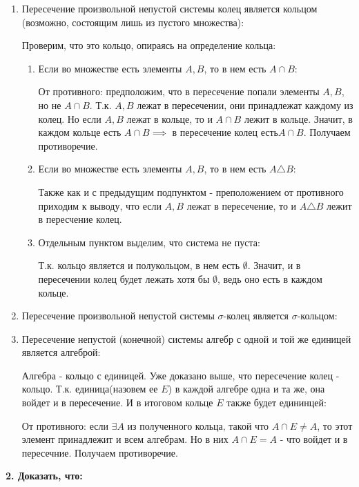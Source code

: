 \documentclass{article}
\begin{document}
\begin{enumerate}
\item Пересечение произвольной непустой системы колец является кольцом (возможно, состоящим лишь из пустого множества):

Проверим, что это кольцо, опираясь на определение кольца:

\begin{enumerate}
\item Если во множестве есть элементы $A, B$, то в нем есть $A \cap B$:

От противного: предположим, что в пересечение попали элементы $A, B$, но не $A \cap B$. Т.к. $A, B$ лежат в пересечении, они принадлежат каждому из колец. Но если $A, B$ лежат в кольце, то и $A \cap B$ лежит в кольце. Значит, в каждом кольце есть $A \cap B \implies$ в пересечение колец есть$A \cap B$. Получаем противоречие.

\item  Если во множестве есть элементы $A, B$, то в нем есть $A \triangle B$:

Также как и с предыдущим подпунктом - преположением от противного приходим к выводу, что если $A, B$ лежат в пересечение, то и  $A \triangle B$ лежит в пересчение колец.

\item Отдельным пунктом выделим, что система не пуста:

Т.к. кольцо является и полукольцом, в нем есть $\emptyset$. Значит, и в пересечении колец будет лежать хотя бы $\emptyset$, ведь оно есть в каждом кольце.
\end{enumerate}

\item Пересечение произвольной непустой системы $\sigma$-колец является $\sigma$-кольцом:


\item Пересечение непустой (конечной) системы алгебр с одной и той же единицей является алгеброй:

Алгебра - кольцо с единицей. Уже доказано выше, что пересечение колец - кольцо. Т.к. единица(назовем ее $E$) в каждой алгебре одна и та же, она войдет и в пересечение. И в итоговом кольце $E$ также будет едининцей:

От противного: если $\exists A \text{ из полученного кольца, такой что } A \cap E \neq A$, то этот элемент принадлежит и всем алгебрам. Но в них $A \cap E = A$ - что войдет и в пересечние. Получаем противоречие.

\end{enumerate}

\noindent \textbf{2. Доказать, что:}
\end{document}
